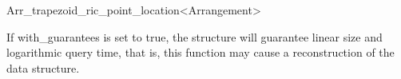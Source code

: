 \begin{ccRefClass}{Arr_trapezoid_ric_point_location<Arrangement>}
\ccModifiers

  {If with\_guarantees is set to true, the structure will guarantee linear size and logarithmic query time, that is, this function may cause a reconstruction of the data structure. }


\end{ccRefClass}

\ccRefPageEnd
